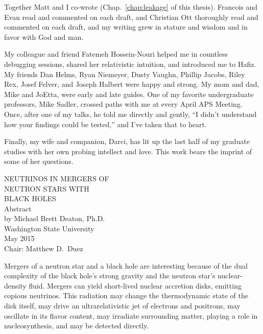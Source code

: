 \documentclass[12pt]{report}
\begin{document}
  Together Matt and I co-wrote \citealt{deat2013-leakage}
  (Chap.~\ref{chap:leakage} of this thesis).
  Francois and Evan read and commented on each draft, and Christian Ott
  thoroughly read and commented on each draft,
  and my writing grew in stature and wisdom and in favor with God and man.

  My colleague and friend Fatemeh Hossein-Nouri helped me in countless debugging
  sessions, shared her relativistic intuition, and introduced me to Hafiz.
  My friends Dan Helms, Ryan Niemeyer, Dusty Vaughn, Phillip Jacobs, Riley
  Rex, Josef Felver, and Joseph Halbert were happy and strong.
  My mom and dad, Mike and JoEtta, were early and late guides.
  One of my favorite undergraduate professors, Mike Sadler, crossed paths with me
  at every April APS Meeting. Once, after one of my talks,
  he told me directly and gently, ``I didn't understand how your findings could
  be tested,'' and I've taken that to heart.

  Finally, my wife and companion, Darci, has lit up the last half of my graduate
  studies with her own probing intellect and love. This work bears the imprint
  of some of her questions.

\newpage

\begin{center}
  \begin{singlespace}
    \label{ssec:abstract}

    {\uppercase{
        Neutrinos in Mergers of\\
        Neutron Stars with\\
        Black Holes}}\\
    \bigskip
    Abstract\\
    \bigskip \bigskip \bigskip
    by Michael Brett Deaton, Ph.D.\\
    Washington State University\\
    May 2015\\
    \bigskip \bigskip \bigskip
    Chair: Matthew D.\ Duez
  \end{singlespace}
\end{center}
  
Mergers of a neutron star and a black hole are interesting because of the dual
complexity of the black hole's strong gravity and the neutron star's
nuclear-density fluid.
Mergers can yield short-lived nuclear accretion disks, emitting copious neutrinos.
This radiation
may change the thermodynamic state of the disk itself,
may drive an ultrarelativistic jet of electrons and positrons,
may oscillate in its flavor content,
may irradiate surrounding matter, playing a role in nucleosynthesis,
and may be detected directly.
\end{document}
